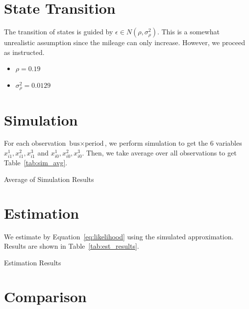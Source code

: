 \documentclass[12pt]{article}[margin=1in]
\begin{document}
\section{State Transition}
The transition of states is guided by $\epsilon\in N(\rho, \sigma_{\rho}^2)$.
This is a somewhat unrealistic assumption since the mileage can only increase.
However, we proceed as instructed.
\begin{itemize}
    \item $\rho=0.19$
    \item $\sigma_{\rho}^2=0.0129$
\end{itemize}

\section{Simulation}\label{sec:simulation}
For each observation $\text{bus} \times \text{period}$, we perform simulation
to get the 6 variables $x_{i1}^1,x_{i1}^2,x_{i1}^3$ and
$x_{i0}^1,x_{i0}^2,x_{i0}^3$. Then, we take average over all observations to
get Table~\ref{tab:sim_avg}.

\begin{table}[!htbp]
    \centering
    
    \caption{Average of Simulation Results}
    \label{tab:sim_avg}
\end{table}

\section{Estimation}\label{sec:estimation}
We estimate by Equation~\ref{eq:likelihood} using the simulated approximation.
Results are shown in Table~\ref{tab:est_results}.
\begin{table}[!htbp]
    \centering
    
    \caption{Estimation Results}
    \label{tab:est_results}
\end{table}

\section{Comparison}
\end{document}
